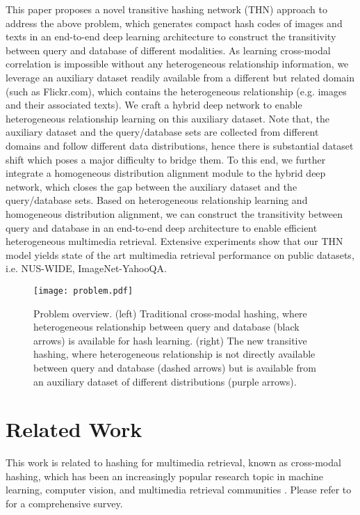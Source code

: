\documentclass{article}
\begin{document}
This paper proposes a novel transitive hashing network (THN) approach to address the above problem, which generates compact hash codes of images and texts in an end-to-end deep learning architecture to construct the transitivity between query and database of different modalities. As learning cross-modal correlation is impossible without any heterogeneous relationship information, we leverage an auxiliary dataset readily available from a different but related domain (such as Flickr.com), which contains the heterogeneous relationship (e.g. images and their associated texts). We craft a hybrid deep network to enable  heterogeneous relationship learning on this auxiliary dataset. Note that, the auxiliary dataset and the query/database sets are collected from different domains and follow different data distributions, hence there is substantial dataset shift which poses a major difficulty to bridge them. To this end, we further integrate a homogeneous distribution alignment module to the hybrid deep network, which closes the gap between the auxiliary dataset and the query/database sets. Based on heterogeneous relationship learning and homogeneous distribution alignment, we can construct the transitivity between query and database in an end-to-end deep architecture to enable efficient heterogeneous multimedia retrieval. Extensive experiments show that our THN model yields state of the art multimedia retrieval performance on public datasets, i.e. NUS-WIDE, ImageNet-YahooQA.

\begin{figure}[tbp]
\centering
\texttt{[image: problem.pdf]}
\caption{Problem overview. (left) Traditional cross-modal hashing, where heterogeneous relationship between query and database  (black arrows) is available for hash learning. (right) The new transitive hashing, where heterogeneous relationship is not directly available between query and database (dashed arrows) but is available from an auxiliary dataset of different distributions (purple arrows).}
\label{fig:problem}
\end{figure}

\section{Related Work}
This work is related to hashing for multimedia retrieval, known as cross-modal hashing, which has been an increasingly popular research topic in machine learning, computer vision, and multimedia retrieval communities \cite{cite:CVPR10CMSSH,cite:IJCAI11CVH,cite:NIPS12CRH,cite:SIGMOD13IMH,cite:PAMI14CMNN,cite:AAAI14SCM,cite:IJCAI15QCH,cite:JDCMH16,cite:KDD16DVSH}. Please refer to \cite{cite:Arxiv14Hashing} for a comprehensive survey.
\end{document}
